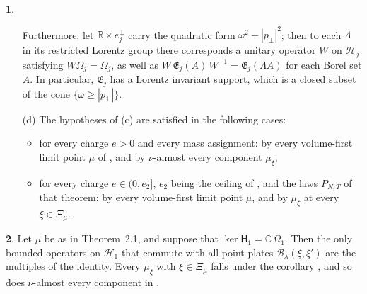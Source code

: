 \documentclass[11pt]{amsart}
\newcommand{\namedhead}{}
\theoremstyle{definition}
\newtheorem*{namedinner}{\namedhead}
\newenvironment{named}[1]{\renewcommand{\namedhead}{#1}\begin{namedinner}}{\end{namedinner}}
\begin{document}
\begin{named}{Corollary 2.2}
\begin{itemize}
Furthermore, let $\mathbb R\times e_j^\perp$ carry the quadratic form $\omega^2-|p_\perp|^2$; then to each $\Lambda$ in its restricted Lorentz group there corresponds a unitary operator $W$ on $\mathcal H_j$ satisfying $W\Omega_j=\Omega_j$, as well as $W\,\mathfrak E_j(A)\,W^{-1}=\mathfrak E_j(\Lambda A)$ for each Borel set $A$.
In particular, $\mathfrak E_j$ has a Lorentz invariant support, which is a closed subset of the cone $\{\omega\ge|p_\perp|\}$.
\item[(d)] The hypotheses of (c) are satisfied in the following cases:
\begin{itemize}
\item for every charge $e>0$ and every mass assignment: by every volume-first limit point $\mu$ of \cite[Theorem~1.3]{QEDII}, and by $\nu$-almost every component $\mu_\xi$;
\item for every charge $e\in(0,e_2]$, $e_2$ being the ceiling of \cite[Theorem~44]{QEDIII}, and the laws $P_{N,T}$ of that theorem: by every volume-first limit point $\mu$, and by $\mu_\xi$ at every $\xi\in\Xi_\mu$.
\end{itemize}
\end{itemize}
\end{named}

\begin{named}{Corollary 2.3}
Let $\mu$ be as in Theorem~2.1, and suppose that $\ker\mathsf H_1=\mathbb C\,\Omega_1$.
Then the only bounded operators on $\mathcal H_1$ that commute with all point plates $\mathcal B_\lambda(\xi,\xi')$ are the multiples of the identity.
Every $\mu_\xi$ with $\xi\in\Xi_\mu$ falls under the corollary \cite[Theorem~44\,(D1)--(D3)]{QEDIII}, and so does $\nu$-almost every component in \cite[Theorem~1.4, Part~I\,(e)]{QEDII}.
\end{named}
\end{document}
